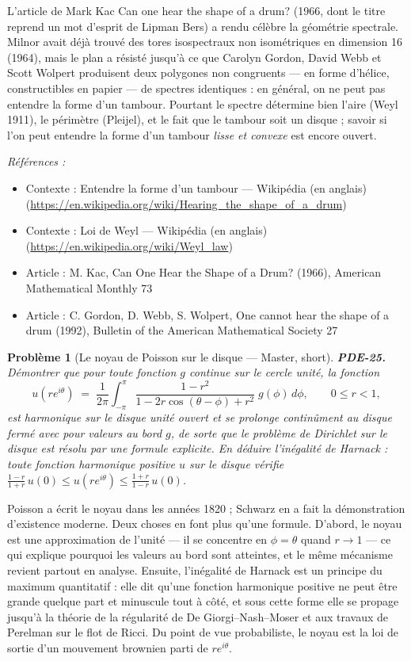 \documentclass[11pt]{article}
\newtheorem{problem}{Problème}
\newenvironment{refs}{\par\small\noindent\emph{Références :}\begin{itemize}\setlength\itemsep{0pt}}{\end{itemize}\normalsize}
\begin{document}
\noindent L'article de Mark Kac \og{} Can one hear the shape of a drum? \fg{} (1966,
dont le titre reprend un mot d'esprit de Lipman Bers) a rendu célèbre la géométrie spectrale.
Milnor avait déjà trouvé des tores isospectraux non isométriques en dimension 16 (1964), mais le
plan a résisté jusqu'à ce que Carolyn Gordon, David Webb et Scott Wolpert produisent deux
polygones non congruents --- en forme d'hélice, constructibles en papier --- de spectres
identiques : en général, on ne peut pas entendre la forme d'un tambour. Pourtant le spectre
détermine bien l'aire (Weyl 1911), le périmètre (Pleijel), et le fait que le tambour soit un
disque ; savoir si l'on peut entendre la forme d'un tambour \textit{lisse et convexe} est encore
ouvert.

\begin{refs}
\item Contexte : Entendre la forme d'un tambour --- Wikipédia (en anglais) (\url{https://en.wikipedia.org/wiki/Hearing_the_shape_of_a_drum})
\item Contexte : Loi de Weyl --- Wikipédia (en anglais) (\url{https://en.wikipedia.org/wiki/Weyl_law})
\item Article : M. Kac, \og{} Can One Hear the Shape of a Drum? \fg{} (1966), American Mathematical Monthly 73
\item Article : C. Gordon, D. Webb, S. Wolpert, \og{} One cannot hear the shape of a drum \fg{} (1992), Bulletin of the American Mathematical Society 27
\end{refs}

\bigskip

\begin{problem}[{Le noyau de Poisson sur le disque --- Master, short}]
\textbf{PDE-25.} Démontrer que pour toute fonction $g$ continue sur le
cercle unité, la fonction
\[ u(re^{i\theta}) \;=\; \frac{1}{2\pi}\int_{-\pi}^{\pi}
\frac{1-r^2}{1 - 2r\cos(\theta-\phi) + r^2}\;g(\phi)\,d\phi, \qquad 0 \le r < 1, \]
est harmonique sur le disque unité ouvert et se prolonge continûment au disque fermé avec pour
valeurs au bord $g$, de sorte que le problème de Dirichlet sur le disque est résolu par une
formule explicite. En déduire l'inégalité de Harnack : toute fonction harmonique positive $u$
sur le disque vérifie $\frac{1-r}{1+r}\,u(0) \le u(re^{i\theta}) \le \frac{1+r}{1-r}\,u(0)$.
\end{problem}

\noindent Poisson a écrit le noyau dans les années 1820 ; Schwarz en a fait
la démonstration d'existence moderne. Deux choses en font plus qu'une formule. D'abord, le
noyau est une approximation de l'unité --- il se concentre en $\phi = \theta$ quand
$r \to 1$ --- ce qui explique pourquoi les valeurs au bord sont atteintes, et le même mécanisme
revient partout en analyse. Ensuite, l'inégalité de Harnack est un principe du maximum
quantitatif : elle dit qu'une fonction harmonique positive ne peut être grande quelque part et
minuscule tout à côté, et sous cette forme elle se propage jusqu'à la théorie de la régularité de
De Giorgi--Nash--Moser et aux travaux de Perelman sur le flot de Ricci. Du point de vue
probabiliste, le noyau est la loi de sortie d'un mouvement brownien parti de
$re^{i\theta}$.
\end{document}
